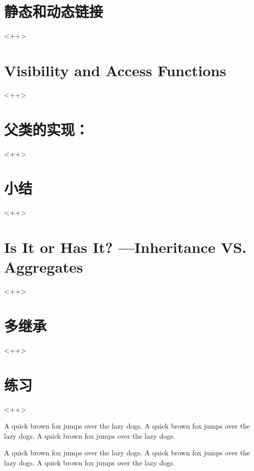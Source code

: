 \section{静态和动态链接}<++>

\section{Visibility and Access Functions}<++>

\section{父类的实现：}<++>

\section{小结}<++>

\section{Is It or Has It? ---Inheritance VS. Aggregates}<++>

\section{多继承}<++>

\section{练习}<++>

A quick brown fox jumps over the lazy dogs.
A quick brown fox jumps over the lazy dogs.
A quick brown fox jumps over the lazy dogs.

A quick brown fox jumps over the lazy dogs.
A quick brown fox jumps over the lazy dogs.
A quick brown fox jumps over the lazy dogs.

\newpage{\thispagestyle{empty}\cleardoublepage}

